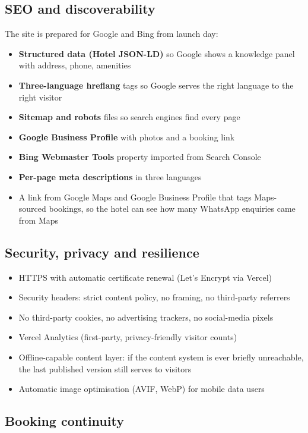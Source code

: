 \documentclass[11pt,a4paper]{article}
\begin{document}
\subsection{SEO and discoverability}

The site is prepared for Google and Bing from launch day:

\begin{itemize}
\item \textbf{Structured data (Hotel JSON-LD)} so Google shows a knowledge panel with address, phone, amenities
\item \textbf{Three-language hreflang} tags so Google serves the right language to the right visitor
\item \textbf{Sitemap and robots} files so search engines find every page
\item \textbf{Google Business Profile} with photos and a booking link
\item \textbf{Bing Webmaster Tools} property imported from Search Console
\item \textbf{Per-page meta descriptions} in three languages
\item A link from Google Maps and Google Business Profile that tags Maps-sourced bookings, so the hotel can see how many WhatsApp enquiries came from Maps
\end{itemize}

\subsection{Security, privacy and resilience}

\begin{itemize}
\item HTTPS with automatic certificate renewal (Let's Encrypt via Vercel)
\item Security headers: strict content policy, no framing, no third-party referrers
\item No third-party cookies, no advertising trackers, no social-media pixels
\item Vercel Analytics (first-party, privacy-friendly visitor counts)
\item Offline-capable content layer: if the content system is ever briefly unreachable, the last published version still serves to visitors
\item Automatic image optimisation (AVIF, WebP) for mobile data users
\end{itemize}

\subsection{Booking continuity}
\end{document}
